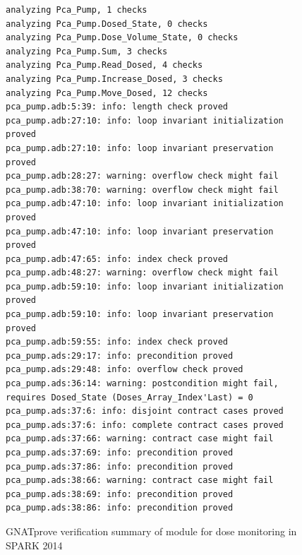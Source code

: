 
\begin{figure}
\singlespacing
\begin{lstlisting}[frame=single, gobble=0]
analyzing Pca_Pump, 1 checks
analyzing Pca_Pump.Dosed_State, 0 checks
analyzing Pca_Pump.Dose_Volume_State, 0 checks
analyzing Pca_Pump.Sum, 3 checks
analyzing Pca_Pump.Read_Dosed, 4 checks
analyzing Pca_Pump.Increase_Dosed, 3 checks
analyzing Pca_Pump.Move_Dosed, 12 checks
pca_pump.adb:5:39: info: length check proved
pca_pump.adb:27:10: info: loop invariant initialization proved
pca_pump.adb:27:10: info: loop invariant preservation proved
pca_pump.adb:28:27: warning: overflow check might fail
pca_pump.adb:38:70: warning: overflow check might fail
pca_pump.adb:47:10: info: loop invariant initialization proved
pca_pump.adb:47:10: info: loop invariant preservation proved
pca_pump.adb:47:65: info: index check proved
pca_pump.adb:48:27: warning: overflow check might fail
pca_pump.adb:59:10: info: loop invariant initialization proved
pca_pump.adb:59:10: info: loop invariant preservation proved
pca_pump.adb:59:55: info: index check proved
pca_pump.ads:29:17: info: precondition proved
pca_pump.ads:29:48: info: overflow check proved
pca_pump.ads:36:14: warning: postcondition might fail, requires Dosed_State (Doses_Array_Index'Last) = 0
pca_pump.ads:37:6: info: disjoint contract cases proved
pca_pump.ads:37:6: info: complete contract cases proved
pca_pump.ads:37:66: warning: contract case might fail
pca_pump.ads:37:69: info: precondition proved
pca_pump.ads:37:86: info: precondition proved
pca_pump.ads:38:66: warning: contract case might fail
pca_pump.ads:38:69: info: precondition proved
pca_pump.ads:38:86: info: precondition proved
\end{lstlisting}
\doublespacing
\caption{GNATprove verification summary of module for dose monitoring in SPARK 2014}
\label{listing:pca_pump_move_dosed_unit_spark2014_gnatprove}
\end{figure}

